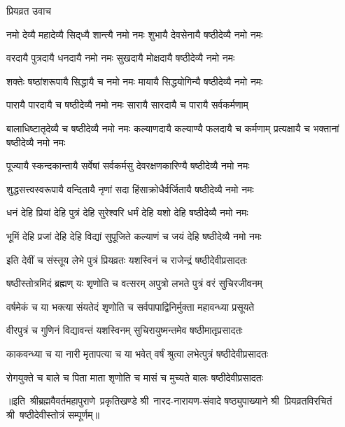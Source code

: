
\centerline{प्रियव्रत उवाच}
\twolineshloka
{नमो देव्यै महादेव्यै सिद्‍ध्यै शान्त्यै नमो नमः}
{शुभायै देवसेनायै षष्ठीदेव्यै नमो नमः}%

\twolineshloka
{वरदायै पुत्रदायै धनदायै नमो नमः}
{सुखदायै मोक्षदायै षष्ठीदेव्यै नमो नमः}%

\twolineshloka
{शक्तेः षष्ठांशरूपायै सिद्धायै च नमो नमः}
{मायायै सिद्धयोगिन्यै षष्ठीदेव्यै नमो नमः}%

\twolineshloka
{पारायै पारदायै च षष्ठीदेव्यै नमो नमः}
{सारायै सारदायै च पारायै सर्वकर्मणाम्}%

\threelineshloka
{बालाधिष्टातृदेव्यै च षष्ठीदेव्यै नमो नमः}
{कल्याणदायै कल्याण्यै फलदायै च कर्मणाम्}
{प्रत्यक्षायै च भक्तानां षष्ठीदेव्यै नमो नमः}%

\twolineshloka
{पूज्यायै स्कन्दकान्तायै सर्वेषां सर्वकर्मसु}
{देवरक्षणकारिण्यै षष्ठीदेव्यै नमो नमः}%

\twolineshloka
{शुद्धसत्त्वस्वरूपायै वन्दितायै नृणां सदा}
{हिंसाक्रोधैर्वर्जितायै षष्ठीदेव्यै नमो नमः}%

\twolineshloka
{धनं देहि प्रियां देहि पुत्रं देहि सुरेश्वरि}
{धर्मं देहि यशो देहि षष्ठीदेव्यै नमो नमः}%

\twolineshloka
{भूमिं देहि प्रजां देहि देहि विद्यां सुपूजिते}
{कल्याणं च जयं देहि षष्ठीदेव्यै नमो नमः}%

\twolineshloka
{इति देवीं च संस्तूय लेभे पुत्रं प्रियव्रतः}
{यशस्विनं च राजेन्द्रं षष्ठीदेवीप्रसादतः}%

\twolineshloka
{षष्ठीस्तोत्रमिदं ब्रह्मण् यः शृणोति च वत्सरम्}
{अपुत्रो लभते पुत्रं वरं सुचिरजीवनम्}

\twolineshloka
{वर्षमेकं च या भक्त्या संयतेदं शृणोति च}
{सर्वपापाद्विनिर्मुक्ता महावन्ध्या प्रसूयते}

\twolineshloka
{वीरपुत्रं च गुणिनं विद्यावन्तं यशस्विनम्}
{सुचिरायुष्मन्तमेव षष्ठीमातृप्रसादतः}

\twolineshloka
{काकवन्ध्या च या नारी मृतापत्या च या भवेत्}
{वर्षं श्रुत्वा लभेत्पुत्रं षष्ठीदेवीप्रसादतः}

\twolineshloka
{रोगयुक्ते च बाले च पिता माता शृणोति च}
{मासं  च मुच्यते बालः षष्ठीदेवीप्रसादतः}

{॥इति~श्रीब्रह्मवैवर्तमहापुराणे~प्रकृतिखण्डे श्री~नारद-नारायण-संवादे षष्ठ्युपाख्याने श्री~प्रियव्रतविरचितं श्री~षष्ठीदेवीस्तोत्रं सम्पूर्णम्॥}